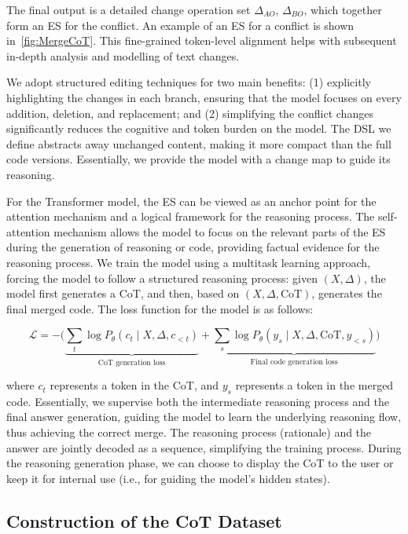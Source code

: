 \documentclass[sigconf,review,anonymous]{acmart}
\begin{document}
The final output is a detailed change operation set $\Delta_{AO}$, $\Delta_{BO}$, which together form an ES for the conflict. An example of an ES for a conflict is shown in~\autoref{fig:MergeCoT}. This fine-grained token-level alignment helps with subsequent in-depth analysis and modelling of text changes.

We adopt structured editing techniques for two main benefits: (1) explicitly highlighting the changes in each branch, ensuring that the model focuses on every addition, deletion, and replacement; and (2) simplifying the conflict changes significantly reduces the cognitive and token burden on the model. The DSL we define abstracts away unchanged content, making it more compact than the full code versions. Essentially, we provide the model with a change map to guide its reasoning.

For the Transformer model, the ES can be viewed as an anchor point for the attention mechanism and a logical framework for the reasoning process. The self-attention mechanism allows the model to focus on the relevant parts of the ES during the generation of reasoning or code, providing factual evidence for the reasoning process. We train the model using a multitask learning approach, forcing the model to follow a structured reasoning process: given $(X, \Delta)$, the model first generates a CoT, and then, based on $(X, \Delta, \text{CoT})$, generates the final merged code. The loss function for the model is as follows:

\begin{equation}
\mathcal{L} = -\Big(\underbrace{\sum_{t} \log P_\theta(c_t \mid X, \Delta, c_{<t})}_{\text{CoT generation loss}} + \underbrace{\sum_{s} \log P_\theta(y_s \mid X, \Delta, \text{CoT}, y_{<s})}_{\text{Final code generation loss}}\Big)
\end{equation}


where $c_t$ represents a token in the CoT, and $y_s$ represents a token in the merged code. Essentially, we supervise both the intermediate reasoning process and the final answer generation, guiding the model to learn the underlying reasoning flow, thus achieving the correct merge. The reasoning process (rationale) and the answer are jointly decoded as a sequence, simplifying the training process. During the reasoning generation phase, we can choose to display the CoT to the user or keep it for internal use (i.e., for guiding the model’s hidden states).

\subsection{Construction of the CoT Dataset}\label{sec: CoT}
\end{document}
